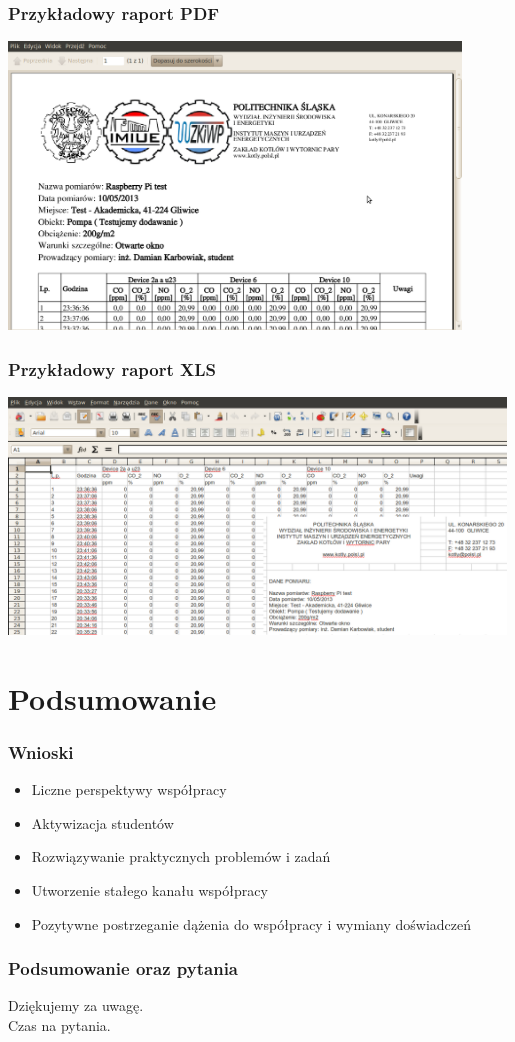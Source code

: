 \documentclass[ucs]{beamer}
\begin{document}
\begin{frame}
\frametitle{Przykładowy raport PDF}
\includegraphics[width=0.9\textwidth]{images/pdf}
\end{frame}

\begin{frame}
\frametitle{Przykładowy raport XLS}
\includegraphics[width=0.99\textwidth]{images/xls}
\end{frame}

\section{Podsumowanie}
\begin{frame}
\frametitle{Wnioski}
\begin{itemize}
\item Liczne perspektywy współpracy
\item Aktywizacja studentów
\item Rozwiązywanie praktycznych problemów i zadań
\item Utworzenie stałego kanału współpracy 
\item Pozytywne postrzeganie dążenia do współpracy i wymiany doświadczeń
\end{itemize}
\end{frame}

\begin{frame}
\frametitle{Podsumowanie oraz pytania}
Dziękujemy za uwagę.
\\\vspace{2cm}
Czas na pytania.
\end{frame}
\end{document}
